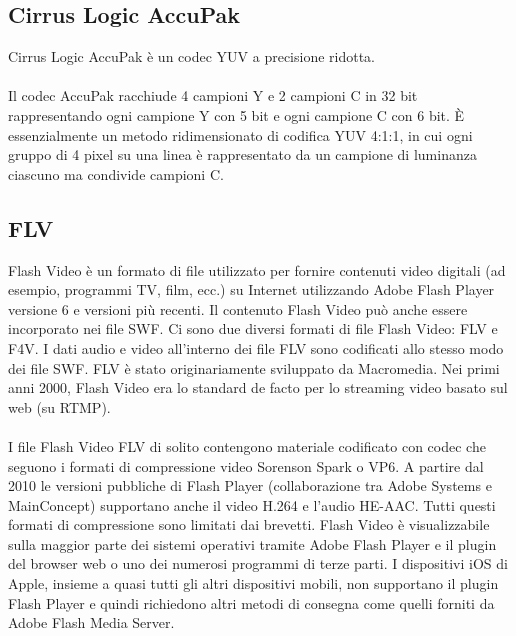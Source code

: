 \subsection{Cirrus Logic AccuPak}
Cirrus Logic AccuPak è un codec YUV a precisione ridotta.
\\
\\
Il codec AccuPak racchiude 4 campioni Y e 2 campioni C in 32 bit rappresentando ogni campione Y con 5 bit e ogni campione C con 6 bit. È essenzialmente un metodo ridimensionato di codifica YUV 4:1:1, in cui ogni gruppo di 4 pixel su una linea è rappresentato da un campione di luminanza ciascuno ma condivide campioni C\cite{CirrusLogicAccuPak}.

\subsection{FLV}
Flash Video è un formato di file utilizzato per fornire contenuti video digitali (ad esempio, programmi TV, film, ecc.) su Internet utilizzando Adobe Flash Player versione 6 e versioni più recenti. Il contenuto Flash Video può anche essere incorporato nei file SWF. Ci sono due diversi formati di file Flash Video: FLV e F4V. I dati audio e video all'interno dei file FLV sono codificati allo stesso modo dei file SWF. FLV è stato originariamente sviluppato da Macromedia. Nei primi anni 2000, Flash Video era lo standard de facto per lo streaming video basato sul web (su RTMP).
\\
\\
I file Flash Video FLV di solito contengono materiale codificato con codec che seguono i formati di compressione video Sorenson Spark o VP6. A partire dal 2010 le versioni pubbliche di Flash Player (collaborazione tra Adobe Systems e MainConcept) supportano anche il video H.264 e l'audio HE-AAC. Tutti questi formati di compressione sono limitati dai brevetti. Flash Video è visualizzabile sulla maggior parte dei sistemi operativi tramite Adobe Flash Player e il plugin del browser web o uno dei numerosi programmi di terze parti. I dispositivi iOS di Apple, insieme a quasi tutti gli altri dispositivi mobili, non supportano il plugin Flash Player e quindi richiedono altri metodi di consegna come quelli forniti da Adobe Flash Media Server\cite{FLV}.

